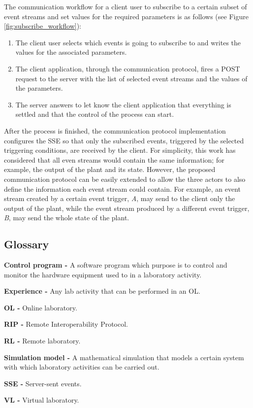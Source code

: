 The communication workflow for a client user to subscribe to a certain subset of event streams and set values for the required parameters is as follows (see Figure \ref{fig:subscribe_workflow}):

\begin{enumerate}
	\item The client user selects which events is going to subscribe to and writes the values for the associated parameters. 
	\item The client application, through the communication protocol, fires a POST request to the server with the list of selected event streams and the values of the parameters.
	\item The server answers to let know the client application that everything is settled and that the control of the process can start.
\end{enumerate}

After the process is finished, the communication protocol implementation configures the SSE so that only the subscribed events, triggered by the selected triggering conditions, are received by the client. For simplicity, this work has considered that all even streams would contain the same information; for example, the output of the plant and its state. However, the proposed communication protocol can be easily extended to allow the three actors to also define the information each event stream could contain. For example, an event stream created by a certain event trigger, \textit{A}, may send to the client only the output of the plant, while the event stream produced by a different event trigger, \textit{B}, may send the whole state of the plant.


\begin{appendices}

\chapter{Glossary}
\textbf{Control program -} A software program which purpose is to control and monitor the hardware equipment used to in a laboratory activity.

\textbf{Experience -} Any lab activity that can be performed in an OL.

\textbf{OL -} Online laboratory.

\textbf{RIP -} Remote Interoperability Protocol.

\textbf{RL -} Remote laboratory.

\textbf{Simulation model -} A mathematical simulation that models a certain system with which laboratory activities can be carried out.

\textbf{SSE -} Server-sent events.

\textbf{VL -} Virtual laboratory.

\end{appendices}


\renewcommand\bibname{References}
